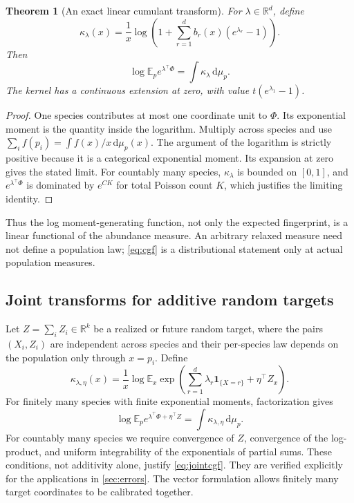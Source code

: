 \documentclass[11pt]{article}
\numberwithin{equation}{section}
\newtheorem{theorem}{Theorem}[section]
\theoremstyle{definition}
\theoremstyle{remark}
\newcommand{\E}{\mathbb E}
\newcommand{\R}{\mathbb R}
\newcommand{\ind}{\mathbf1}
\newcommand{\dd}{\,\mathrm d}
\begin{document}
\begin{theorem}[An exact linear cumulant transform]\label{thm:cumulant}
For $\lambda\in\R^d$, define
\begin{equation}\label{eq:kappa}
 \kappa_\lambda(x)=\frac1x\log\left(1+\sum_{r=1}^d b_r(x)(e^{\lambda_r}-1)\right).
\end{equation}
Then
\begin{equation}\label{eq:cgf}
 \log\E_p e^{\lambda^\top\Phi}=\int\kappa_\lambda\dd\mu_p.
\end{equation}
The kernel has a continuous extension at zero, with value $t(e^{\lambda_1}-1)$.
\end{theorem}
\begin{proof}
One species contributes at most one coordinate unit to $\Phi$. Its exponential moment is the quantity inside the logarithm. Multiply across species and use $\sum_i f(p_i)=\int f(x)/x\dd\mu_p(x)$. The argument of the logarithm is strictly positive because it is a categorical exponential moment. Its expansion at zero gives the stated limit. For countably many species, $\kappa_\lambda$ is bounded on $[0,1]$, and $e^{\lambda^\top\Phi}$ is dominated by $e^{C K}$ for total Poisson count $K$, which justifies the limiting identity.
\end{proof}
Thus the log moment-generating function, not only the expected fingerprint, is a linear functional of the abundance measure. An arbitrary relaxed measure need not define a population law; \eqref{eq:cgf} is a distributional statement only at actual population measures.

\subsection{Joint transforms for additive random targets}\label{subsec:joint}
Let $Z=\sum_i Z_i\in\R^k$ be a realized or future random target, where the pairs $(X_i,Z_i)$ are independent across species and their per-species law depends on the population only through $x=p_i$. Define
\begin{equation}\label{eq:jointkernelgeneral}
 \kappa_{\lambda,\eta}(x)
 =\frac1x\log\E_x\exp\left(
    \sum_{r=1}^d\lambda_r\ind_{\{X=r\}}+\eta^\top Z_x\right).
\end{equation}
For finitely many species with finite exponential moments, factorization gives
\begin{equation}\label{eq:jointcgf}
 \log\E_p e^{\lambda^\top\Phi+\eta^\top Z}
 =\int\kappa_{\lambda,\eta}\dd\mu_p.
\end{equation}
For countably many species we require convergence of $Z$, convergence of the log-product, and uniform integrability of the exponentials of partial sums. These conditions, not additivity alone, justify \eqref{eq:jointcgf}. They are verified explicitly for the applications in \cref{sec:errors}. The vector formulation allows finitely many target coordinates to be calibrated together.
\end{document}
